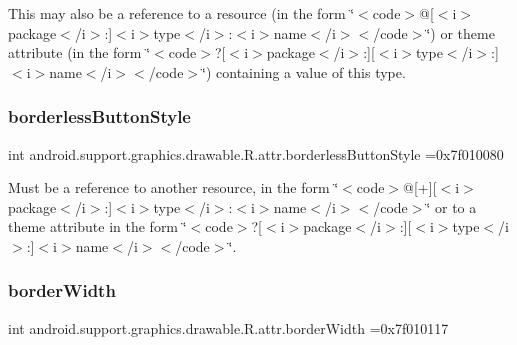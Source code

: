 This may also be a reference to a resource (in the form \char`\"{}$<$code$>$@\mbox{[}$<$i$>$package$<$/i$>$\+:\mbox{]}$<$i$>$type$<$/i$>$\+:$<$i$>$name$<$/i$>$$<$/code$>$\char`\"{}) or theme attribute (in the form \char`\"{}$<$code$>$?\mbox{[}$<$i$>$package$<$/i$>$\+:\mbox{]}\mbox{[}$<$i$>$type$<$/i$>$\+:\mbox{]}$<$i$>$name$<$/i$>$$<$/code$>$\char`\"{}) containing a value of this type. \mbox{\label{classandroid_1_1support_1_1graphics_1_1drawable_1_1R_1_1attr_a3865d3a1db4ee26e6b7035e7178eaeb2}} 
\subsubsection{\texorpdfstring{borderless\+Button\+Style}{borderlessButtonStyle}}
{\footnotesize\ttfamily int android.\+support.\+graphics.\+drawable.\+R.\+attr.\+borderless\+Button\+Style =0x7f010080\hspace{0.3cm}{\ttfamily [static]}}

Must be a reference to another resource, in the form \char`\"{}$<$code$>$@\mbox{[}+\mbox{]}\mbox{[}$<$i$>$package$<$/i$>$\+:\mbox{]}$<$i$>$type$<$/i$>$\+:$<$i$>$name$<$/i$>$$<$/code$>$\char`\"{} or to a theme attribute in the form \char`\"{}$<$code$>$?\mbox{[}$<$i$>$package$<$/i$>$\+:\mbox{]}\mbox{[}$<$i$>$type$<$/i$>$\+:\mbox{]}$<$i$>$name$<$/i$>$$<$/code$>$\char`\"{}. \mbox{\label{classandroid_1_1support_1_1graphics_1_1drawable_1_1R_1_1attr_acd89ae7e43611d2583dc3464d9b59761}} 
\subsubsection{\texorpdfstring{border\+Width}{borderWidth}}
{\footnotesize\ttfamily int android.\+support.\+graphics.\+drawable.\+R.\+attr.\+border\+Width =0x7f010117\hspace{0.3cm}{\ttfamily [static]}}

